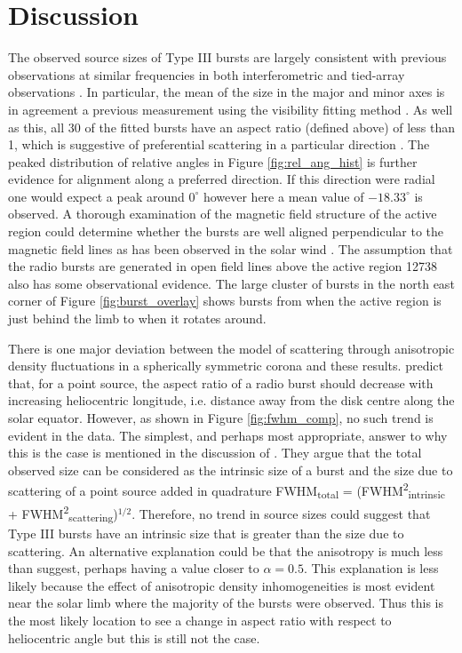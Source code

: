 \section{Discussion}
\label{sec:obsvtheory_discussion}
The observed source sizes of Type III bursts are largely consistent with previous observations at similar frequencies in both interferometric and tied-array observations \citep{Kontar2017, Zhang2020}. In particular, the mean of the size in the major and minor axes is in agreement a previous measurement using the visibility fitting method \citep{Murphy2021}. As well as this, all 30 of the fitted bursts have an aspect ratio (defined above) of less than 1, which is suggestive of preferential scattering in a particular direction \citep{Anantharamaiah1994, Bastian1994}. The peaked distribution of relative angles in Figure \ref{fig:rel_ang_hist} is further evidence for alignment along a preferred direction. If this direction were radial one would expect a peak around $0^\circ$ however here a mean value of $-18.33^\circ$ is observed. A thorough examination of the magnetic field structure of the active region could determine whether the bursts are well aligned perpendicular to the magnetic field lines as has been observed in the solar wind \citep{Anantharamaiah1994, SasikumarRaja2016}. The assumption that the radio bursts are generated in open field lines above the active region 12738 also has some observational evidence. The large cluster of bursts in the north east corner of Figure \ref{fig:burst_overlay} shows bursts from when the active region is just behind the limb to when it rotates around.

There is one major deviation between the model of scattering through anisotropic density fluctuations in a spherically symmetric corona and these results. \cite{Kontar2019} predict that, for a point source, the aspect ratio of a radio burst should decrease with increasing heliocentric longitude, i.e. distance away from the disk centre along the solar equator. However, as shown in Figure \ref{fig:fwhm_comp}, no such trend is evident in the data.  The simplest, and perhaps most appropriate, answer to why this is the case is mentioned in the discussion of \cite{Kontar2019}. They argue that the total observed size can be considered as the intrinsic size of a burst and the size due to scattering of a point source added in quadrature FWHM\textsubscript{total} = (FWHM\textsuperscript{2}\textsubscript{intrinsic} + FWHM\textsuperscript{2}\textsubscript{scattering})$^{1/2}$. Therefore, no trend in source sizes could suggest that Type III bursts have an intrinsic size that is greater than the size due to scattering. An alternative explanation could be that the anisotropy is much less than \cite{Kontar2019} suggest, perhaps having a value closer to $\alpha = 0.5$. This explanation is less likely because the effect of anisotropic density inhomogeneities is most evident near the solar limb where the majority of the bursts were observed. Thus this is the most likely location to see a change in aspect ratio with respect to heliocentric angle but this is still not the case.

